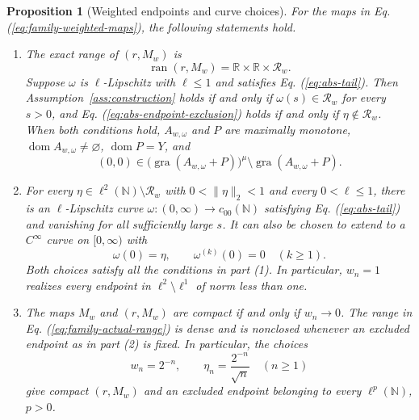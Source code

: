 \documentclass[11pt]{article}
\newcommand{\R}{\mathbb R}
\newcommand{\N}{\mathbb N}
\newcommand{\gra}{\operatorname{gra}}
\newcommand{\dom}{\operatorname{dom}}
\newtheorem{proposition}{Proposition}
\theoremstyle{definition}
\theoremstyle{remark}
\begin{document}
\begin{proposition}[Weighted endpoints and curve choices]
\label{cor:family-weighted-endpoints}
For the maps in Eq. (\ref{eq:family-weighted-maps}), the following statements hold.
\begin{enumerate}
\item The exact range of $(r,M_w)$ is
\begin{equation}
\operatorname{ran}(r,M_w)=\R\times\R\times\mathcal R_w.
\label{eq:family-actual-range}
\end{equation}
Suppose $\omega$ is $\ell$-Lipschitz with $\ell\le1$ and satisfies Eq. (\ref{eq:abs-tail}). Then Assumption~\ref{ass:construction} holds if and only if $\omega(s)\in\mathcal R_w$ for every $s>0$, and Eq. (\ref{eq:abs-endpoint-exclusion}) holds if and only if $\eta\notin\mathcal R_w$. When both conditions hold, $A_{w,\omega}$ and $P$ are maximally monotone, $\dom A_{w,\omega}\ne\varnothing$, $\dom P=Y$, and
\[
(0,0)\in\bigl(\gra(A_{w,\omega}+P)\bigr)^\mu
\setminus\gra(A_{w,\omega}+P).
\]
\item For every $\eta\in\ell^2(\N)\setminus\mathcal R_w$ with $0<\|\eta\|_2<1$ and every $0<\ell\le1$, there is an $\ell$-Lipschitz curve $\omega:(0,\infty)\to c_{00}(\N)$ satisfying Eq. (\ref{eq:abs-tail}) and vanishing for all sufficiently large $s$. It can also be chosen to extend to a $C^\infty$ curve on $[0,\infty)$ with
\[
\omega(0)=\eta,\qquad \omega^{(k)}(0)=0\quad(k\ge1).
\]
Both choices satisfy all the conditions in part (1). In particular, $w_n=1$ realizes every endpoint in $\ell^2\setminus\ell^1$ of norm less than one.
\item The maps $M_w$ and $(r,M_w)$ are compact if and only if $w_n\to0$. The range in Eq. (\ref{eq:family-actual-range}) is dense and is nonclosed whenever an excluded endpoint as in part (2) is fixed. In particular, the choices
\begin{equation}
w_n=2^{-n},\qquad \eta_n=\frac{2^{-n}}{\sqrt n}\quad(n\ge1)
\label{eq:family-compact-example}
\end{equation}
give compact $(r,M_w)$ and an excluded endpoint belonging to every $\ell^p(\N)$, $p>0$.
\end{enumerate}
\end{proposition}
\end{document}
